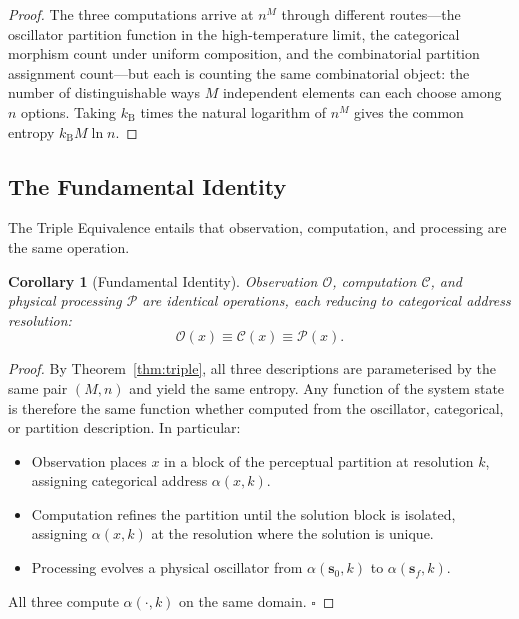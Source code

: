 \documentclass[twocolumn,11pt,a4paper]{article}
\newtheorem{corollary}[theorem]{Corollary}
\newcommand{\kb}{k_{\mathrm{B}}}
\begin{document}
\begin{proof}
The three computations arrive at $n^M$ through different routes---the oscillator partition function in the high-temperature limit, the categorical morphism count under uniform composition, and the combinatorial partition assignment count---but each is counting the same combinatorial object: the number of distinguishable ways $M$ independent elements can each choose among $n$ options. Taking $\kb$ times the natural logarithm of $n^M$ gives the common entropy $\kb M \ln n$.
\end{proof}

\subsection{The Fundamental Identity}

The Triple Equivalence entails that observation, computation, and processing are the same operation.

\begin{corollary}[Fundamental Identity]
\label{cor:fundamental}
Observation $\mathcal{O}$, computation $\mathcal{C}$, and physical processing $\mathcal{P}$ are identical operations, each reducing to categorical address resolution:
\begin{equation}
\mathcal{O}(x) \equiv \mathcal{C}(x) \equiv \mathcal{P}(x).
\end{equation}
\end{corollary}

\begin{proof}
By Theorem~\ref{thm:triple}, all three descriptions are parameterised by the same pair $(M, n)$ and yield the same entropy. Any function of the system state is therefore the same function whether computed from the oscillator, categorical, or partition description. In particular:
\begin{itemize}[leftmargin=*,itemsep=1pt]
\item Observation places $x$ in a block of the perceptual partition at resolution $k$, assigning categorical address $\alpha(x, k)$.
\item Computation refines the partition until the solution block is isolated, assigning $\alpha(x, k)$ at the resolution where the solution is unique.
\item Processing evolves a physical oscillator from $\alpha(\mathbf{s}_0, k)$ to $\alpha(\mathbf{s}_f, k)$.
\end{itemize}
All three compute $\alpha(\cdot, k)$ on the same domain. $\square$
\end{proof}
\end{document}
